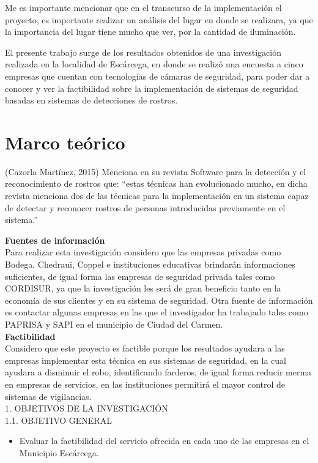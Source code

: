 \documentclass[12pt] {report}
\begin{document}
Me es importante mencionar que en el transcurso de la implementación el proyecto, es importante realizar un análisis del lugar en donde se realizara, ya que la importancia del lugar tiene mucho que ver, por la cantidad de iluminación.

El presente trabajo surge de los resultados obtenidos de una investigación realizada en la localidad de Escárcega, en donde se realizó una encuesta a cinco empresas que cuentan con tecnologías de cámaras de seguridad, para poder dar a conocer y ver la factibilidad sobre la implementación de sistemas de seguridad basadas en sistemas de detecciones de rostros. 

 



\section{Marco teórico}
(Cazorla Martínez, 2015) Menciona en su revista Software para la detección y el reconocimiento de rostros que:
“estas técnicas han evolucionado mucho, en dicha revista menciona dos de las técnicas para la implementación en un sistema capaz de detectar y reconocer rostros de personas introducidas previamente en el sistema.”


 \textbf{Fuentes de información }\\
Para realizar esta investigación considero que las empresas privadas como Bodega, Chedraui, Coppel e instituciones educativas brindarán informaciones suficientes, de igual forma las empresas de seguridad privada tales como CORDISUR, ya que la investigación les será de gran beneficio tanto en la economía de sus clientes  y en su sistema de seguridad.
Otra fuente de información es contactar algunas empresas en las que el investigador ha  trabajado tales como PAPRISA y SAPI en el municipio de Ciudad del Carmen.\\
\textbf{Factibilidad }\\
Considero que este proyecto es factible porque los resultados ayudara a las empresas implementar esta técnica en sus sistemas de seguridad, en la cual ayudara a disminuir el robo, identificando farderos, de igual forma reducir merma en empresas de servicios, en las instituciones permitirá el mayor control de sistemas de vigilancias.\\ 
1. OBJETIVOS DE LA INVESTIGACIÓN\\
1.1. OBJETIVO GENERAL    
\begin{itemize}
\item  Evaluar la factibilidad del servicio ofrecida en cada uno de las empresas en el Municipio Escárcega.
\end{itemize}
\end{document}
